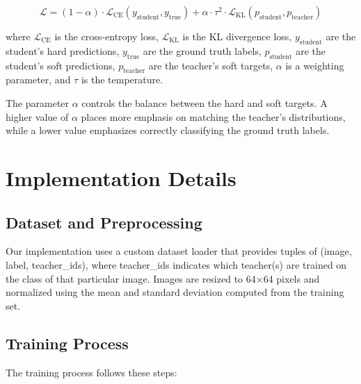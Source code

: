 \documentclass[conference]{IEEEtran}
\begin{document}
\begin{equation}
\mathcal{L} = (1-\alpha) \cdot \mathcal{L}_{\text{CE}}(y_{\text{student}}, y_{\text{true}}) + \alpha \cdot \tau^2 \cdot \mathcal{L}_{\text{KL}}(p_{\text{student}}, p_{\text{teacher}})
\end{equation}

where $\mathcal{L}_{\text{CE}}$ is the cross-entropy loss, $\mathcal{L}_{\text{KL}}$ is the KL divergence loss, $y_{\text{student}}$ are the student's hard predictions, $y_{\text{true}}$ are the ground truth labels, $p_{\text{student}}$ are the student's soft predictions, $p_{\text{teacher}}$ are the teacher's soft targets, $\alpha$ is a weighting parameter, and $\tau$ is the temperature.

The parameter $\alpha$ controls the balance between the hard and soft targets. A higher value of $\alpha$ places more emphasis on matching the teacher's distributions, while a lower value emphasizes correctly classifying the ground truth labels.

\section{Implementation Details}
\subsection{Dataset and Preprocessing}
Our implementation uses a custom dataset loader that provides tuples of (image, label, teacher\_ids), where teacher\_ids indicates which teacher(s) are trained on the class of that particular image. Images are resized to 64×64 pixels and normalized using the mean and standard deviation computed from the training set.

\subsection{Training Process}
The training process follows these steps:
\end{document}
